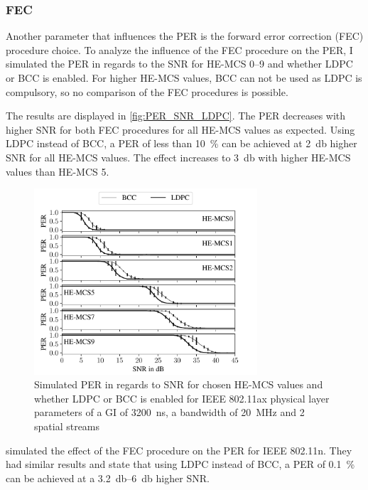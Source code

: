 \subsubsection*{\acf{FEC}}
Another parameter that influences the \ac{PER} is the forward error correction (FEC) procedure choice. To
analyze the influence of the FEC procedure on the \ac{PER}, I simulated the \ac{PER} in regards to the \ac{SNR} for HE-MCS
\numrange{0}{9} and whether \ac{LDPC} or \ac{BCC} is enabled. For higher HE-MCS values, \ac{BCC} can not be used as \ac{LDPC} is compulsory, so no comparison of the \ac{FEC} procedures is possible.

The results are displayed in \autoref{fig:PER_SNR_LDPC}. The \ac{PER} decreases with higher \ac{SNR} for both \ac{FEC} procedures for all HE-MCS values as
expected. Using \ac{LDPC} instead of \ac{BCC}, a \ac{PER} of less than \SI{10}{\percent} can be achieved at \SI{2}{\decibel} higher \ac{SNR}
for all HE-MCS values. The effect increases to \SI{3}{\decibel} with higher HE-MCS values than HE-MCS \num{5}.
\begin{figure}[H]%
   \centering
   \includegraphics[width=0.74\textwidth]{figures/LDPC_PER_to_SNR.pdf}
   \caption{Simulated \ac{PER} in regards to \ac{SNR} for chosen HE-\ac{MCS} values and whether \ac{LDPC} or \ac{BCC} is enabled for IEEE 802.11ax physical layer parameters of a \ac{GI} of \SI{3200}{\nano\second}, a bandwidth of \SI{20}{\mega\hertz} and 2 spatial streams}%
   \label{fig:PER_SNR_LDPC}%
\end{figure}

\textcite{syafei_performance_2009} simulated the effect of the \ac{FEC} procedure on the \ac{PER} for IEEE 802.11n. They
had similar results and state that using \ac{LDPC} instead of \ac{BCC}, a \ac{PER} of \SI{0.1}{\percent}  can be achieved at a
\SIrange{3.2}{6}{\decibel} higher \ac{SNR}.

